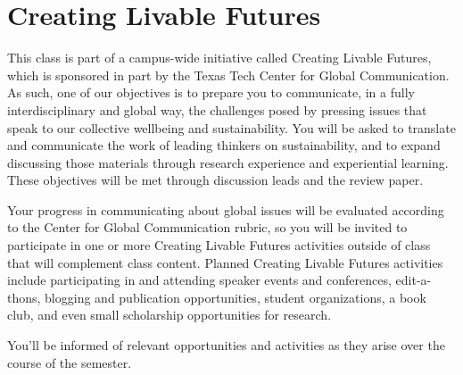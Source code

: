 \documentclass[12pt, notitlepage]{article}   	%
\begin{document}
{\section{Creating Livable Futures}
This class is part of a campus-wide initiative called Creating Livable Futures, 
which is sponsored in part by the Texas Tech Center for Global Communication. 
As such, one of our objectives is to prepare you to communicate, 
in a fully interdisciplinary and global way, the challenges posed by pressing issues 
that speak to our collective wellbeing and sustainability. You will be asked to translate 
and communicate the work of leading thinkers on sustainability, and to expand discussing 
those materials through research experience and experiential learning.
These objectives will be met through discussion leads and the review paper. 

Your progress in communicating about global issues will be evaluated according to the 
Center for Global Communication rubric, so you will be invited to participate 
in one or more Creating Livable Futures activities outside of class that will 
complement class content. 
Planned Creating Livable Futures activities include participating in and attending 
speaker events and conferences, edit-a-thons, blogging and publication opportunities, 
student organizations, a book club, and even small scholarship opportunities for research. 

You’ll be informed of relevant opportunities and activities as they arise over 
the course of the semester.

\newpage

}
\end{document}
